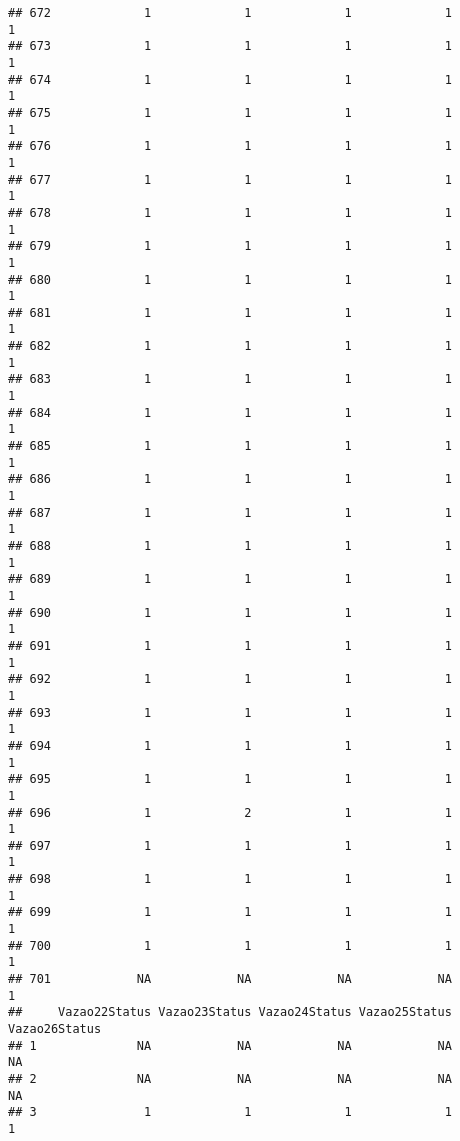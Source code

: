 \documentclass[
]{article}
\begin{document}
\begin{verbatim}
## 672             1             1             1             1             1
## 673             1             1             1             1             1
## 674             1             1             1             1             1
## 675             1             1             1             1             1
## 676             1             1             1             1             1
## 677             1             1             1             1             1
## 678             1             1             1             1             1
## 679             1             1             1             1             1
## 680             1             1             1             1             1
## 681             1             1             1             1             1
## 682             1             1             1             1             1
## 683             1             1             1             1             1
## 684             1             1             1             1             1
## 685             1             1             1             1             1
## 686             1             1             1             1             1
## 687             1             1             1             1             1
## 688             1             1             1             1             1
## 689             1             1             1             1             1
## 690             1             1             1             1             1
## 691             1             1             1             1             1
## 692             1             1             1             1             1
## 693             1             1             1             1             1
## 694             1             1             1             1             1
## 695             1             1             1             1             1
## 696             1             2             1             1             1
## 697             1             1             1             1             1
## 698             1             1             1             1             1
## 699             1             1             1             1             1
## 700             1             1             1             1             1
## 701            NA            NA            NA            NA             1
##     Vazao22Status Vazao23Status Vazao24Status Vazao25Status Vazao26Status
## 1              NA            NA            NA            NA            NA
## 2              NA            NA            NA            NA            NA
## 3               1             1             1             1             1

\end{verbatim}
\end{document}
